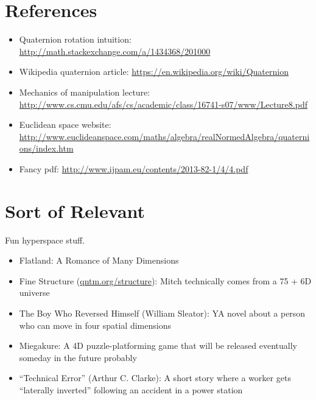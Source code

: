 \documentclass[12pt]{article}
\begin{document}
		
	\section{References}

	
	\begin{itemize}
		\item Quaternion rotation intuition: \url{http://math.stackexchange.com/a/1434368/201000}
		\item Wikipedia quaternion article: \url{https://en.wikipedia.org/wiki/Quaternion}
		\item Mechanics of manipulation lecture: \url{http://www.cs.cmu.edu/afs/cs/academic/class/16741-s07/www/Lecture8.pdf}
		\item Euclidean space website: \url{http://www.euclideanspace.com/maths/algebra/realNormedAlgebra/quaternions/index.htm}
		\item Fancy pdf: \url{http://www.ijpam.eu/contents/2013-82-1/4/4.pdf}		
	\end{itemize}
	
	\section{Sort of Relevant}
	
	Fun hyperspace stuff.
	\begin{itemize}
		\item Flatland: A Romance of Many Dimensions
		\item Fine Structure (\url{qntm.org/structure}): Mitch technically comes from a 75 + 6D universe
		\item The Boy Who Reversed Himself (William Sleator): YA novel about a person who can move in four spatial dimensions		
		\item Miegakure: A 4D puzzle-platforming game that will be released eventually someday in the future probably
		\item ``Technical Error'' (Arthur C. Clarke): A short story where a worker gets ``laterally inverted'' following an accident in a power station
	\end{itemize}
\end{document}
